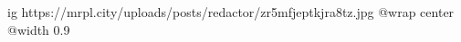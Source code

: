  
 
 
 
 

\ifcmt
  ig https://mrpl.city/uploads/posts/redactor/zr5mfjeptkjra8tz.jpg
  @wrap center
  @width 0.9
\fi
